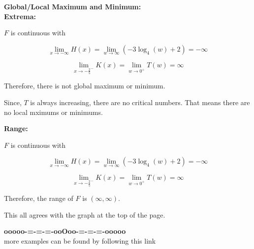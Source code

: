 \documentclass{ximera}
\begin{document}
\textbf{\textcolor{blue!55!black}{Global/Local Maximum and Minimum:}} \\
\textbf{Extrema:} 

$F$ is continuous with 




\[
\lim\limits_{x \to -\infty} H(x)  = \lim\limits_{w \to \infty} (-3 \log_4(w) + 2)  = -\infty
\]



\[
\lim\limits_{x \to -\frac{2}{5}^-} K(x)  = \lim\limits_{w \to 0^+} T(w) = \infty
\]


Therefore, there is not global maximum or minimum. 


Since, $T$ is always increasing, there are no critical numbers.  That means there are no local mximums or minimums. 












\textbf{\textcolor{blue!55!black}{Range:}} 


$F$ is continuous with 




\[
\lim\limits_{x \to -\infty} H(x)  = \lim\limits_{w \to \infty} (-3 \log_4(w) + 2)  = -\infty
\]



\[
\lim\limits_{x \to -\frac{2}{5}^-} K(x)  = \lim\limits_{w \to 0^+} T(w) = \infty
\]


Therefore, the range of $F$ is $(\infty, \infty)$.





This all agrees with the graph at the top of the page. 

















\begin{onlineOnly}
\begin{center}
\textbf{\textcolor{green!50!black}{ooooo-=-=-=-ooOoo-=-=-=-ooooo}} \\

more examples can be found by following this link\\ 

\end{center}
\end{onlineOnly}
\end{document}
